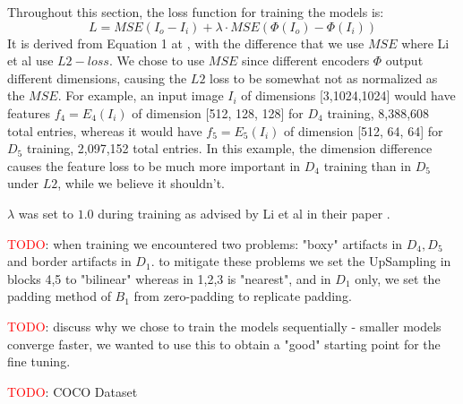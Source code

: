 Throughout this section, the loss function for training the models is:
\begin{equation}\label{eq:loss}
L = MSE(I_o-I_i) + \lambda \cdot MSE(\Phi(I_o)-\Phi(I_i))
\end{equation}
It is derived from Equation 1 at \cite{bib11}, with the difference that we use $MSE$ where Li et al use $L2 -loss$. We chose to use $MSE$ since different encoders $\Phi$ output different dimensions, causing the $L2$ loss to be  somewhat not as normalized as the $MSE$. For example, an input image $I_i$ of dimensions [3,1024,1024] would have features $f_4=E_4(I_i)$ of dimension [512, 128, 128] for $D_4$ training, 8,388,608 total entries, whereas it would have $f_5=E_5(I_i)$ of dimension [512, 64, 64] for $D_5$ training, 2,097,152 total entries. In this example, the dimension difference causes the feature loss to be much more important in $D_4$ training than in $D_5$ under $L2$, while we believe it shouldn't.

$\lambda$ was set to $1.0$ during training as advised by Li et al in their paper \cite{bib11}.

\textcolor{red}{TODO}: when training we encountered two problems: "boxy" artifacts in $D_4, D_5$ and border artifacts in $D_1$. to mitigate these problems we set the UpSampling in blocks 4,5 to "bilinear" whereas in 1,2,3 is "nearest", and in $D_1$ only, we set the padding method of $B_1$ from zero-padding to replicate padding.

\textcolor{red}{TODO}: discuss why we chose to train the models sequentially - smaller models converge faster, we wanted to use this to obtain a "good" starting point for the fine tuning.

\textcolor{red}{TODO}: COCO Dataset